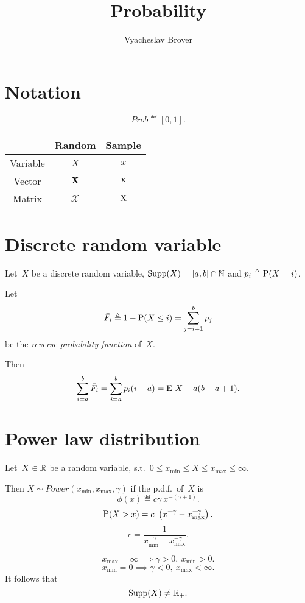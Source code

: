 \documentclass[10pt,a4paper]{article}
\title{Probability}
\author{Vyacheslav Brover}
\theoremstyle{plain} \newtheorem{Lem}{Lemma}
\begin{document}
\maketitle
\tableofcontents


\section{Notation}

$$ Prob \eqdef [0,1]. $$

\begin{tabular}{|c|c|c|}
\hline & Random & Sample \\
\hline
\hline Variable & $X$ & $x$ \\
\hline Vector   & $\ve X$ & $\ve x$ \\
\hline Matrix   & $\mathcal X$ & $\mat X$ \\
\hline
\end{tabular}


\section{Discrete random variable}
Let~$X$ be a discrete random variable, $\supp(X) = [a,b]\cap \N$ and $p_i \eqdef \P(X=i)$.

Let
$$\bar F_i \eqdef 1 - \P(X \le i) = \sum_{j=i+1}^b p_j$$
be the {\em reverse probability function} of~$X$.

Then
\begin{equation}
 \sum_{i=a}^b \bar F_i = \sum_{i=a}^b p_i (i-a) = \E X - a (b-a+1).  \label{sum_rev_pf}
\end{equation}



\section {Power law distribution}

Let~$X \in \R$ be a random variable, s.t.~$0 \le x_{\mathrm {min}} \le X \le x_{\mathrm {max}} \le \infty $.

Then $X \sim Power(x_{\mathrm {min}},x_{\mathrm {max}},\gamma)$ if the p.d.f.~of~$X$ is
$$ \phi(x) \eqdef c \gamma \ x^{- (\gamma + 1)}. $$
$$ \P(X > x) = c \ \left(x^{-\gamma} - x_{\mathrm {max}}^{-\gamma} \right). $$
$$ c = \frac 1 {x_{\mathrm {min}}^{-\gamma} - x_{\mathrm {max}}^{-\gamma}}. $$

$$ x_{\mathrm {max}} = \infty \implies \gamma > 0, \ x_{\mathrm {min}} > 0. $$
$$ x_{\mathrm {min}} = 0 \implies \gamma < 0, \ x_{\mathrm {max}} < \infty. $$
It follows that
$$ \supp(X) \ne \R_+. $$
\end{document}
